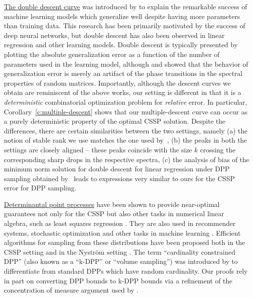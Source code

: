 \documentclass{article}
\begin{document}
\underline{The double descent curve} was introduced by \citet{BHMM19} to explain
the remarkable success of machine learning models which generalize
well despite having more parameters than training data. This research 
has been primarily motivated by the success of deep neural networks,
but double descent has also been observed in linear regression
\citep{belkin2019two,BLLT19_TR,surrogate-design} and other learning models.
Double descent is typically presented by plotting
the absolute generalization error as a function of the number of parameters used in the
learning model, although \citet{double-descent-condition} and
\citet{zhenyu2020double} showed that the 
behavior of generalization error is merely an artifact of the phase
transitions in the spectral properties of random
matrices. Importantly, although the descent curves we obtain are 
reminiscent of the above works, our setting is different in that it is
a \emph{deterministic} combinatorial 
optimization problem for \emph{relative} error. In particular,
Corollary~\ref{c:multiple-descent} shows that our multiple-descent
curve can 
occur as a purely deterministic property of the optimal CSSP
solution. Despite the differences, there are certain similarities
between the two settings, namely (a) the notion of stable rank we use
matches the one used by~\citet{BLLT19_TR}, (b) the peaks in both the
settings are closely aligned -- these peaks coincide with the size $k$
crossing the corresponding sharp drops in the respective spectra, (c)
the analysis of bias of the minimum norm solution for double descent
for linear regression under DPP sampling obtained
by~\citet{surrogate-design} leads to expressions very similar to ours
for the CSSP error for DPP sampling. 

\underline{Determinantal point processes} have been shown to provide
near-optimal guarantees not only for the CSSP but also other tasks in
numerical linear algebra, such as least squares regression
\citep[e.g.,][]{avron-boutsidis13,unbiased-estimates-journal,minimax-experimental-design}.
They are also used in recommender systems, stochastic optimization and other
tasks in machine learning \citep[for a review,
see][]{dpps-in-randnla,dpp-ml}. Efficient algorithms for sampling from these
distributions have been proposed both in the CSSP setting \citep[i.e.,
given matrix $\A$; see, e.g.,][]{efficient-volume-sampling,dpp-intermediate}
and in the Nystr\"om setting \citep[i.e., given kernel $\K$;
see, e.g.,][]{rayleigh-mcmc,dpp-sublinear}. The term ``cardinality constrained
DPP'' (also known as a ``k-DPP'' or ``volume sampling'') was introduced by \citet{k-dpp} to
differentiate from standard DPPs which have random cardinality.
Our proofs rely in part on converting DPP bounds to
k-DPP bounds via a refinement of the
concentration of measure argument used by
\citet{bayesian-experimental-design}.
\end{document}
